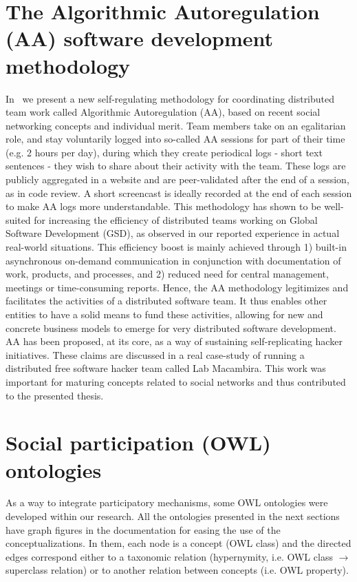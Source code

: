 \begin{apendicesenv}
\section{The Algorithmic Autoregulation (AA) software development methodology}\label{sec:aa}
In~\cite{aaPaper} we present a new self-regulating methodology for coordinating distributed team work called Algorithmic Autoregulation (AA),
based on recent social networking concepts and individual merit.
Team members take on an egalitarian role, and stay voluntarily logged into so-called AA sessions for part of their time 
(e.g. 2 hours per day), during which they create periodical logs - short text sentences - 
they wish to share about their activity with the team.
These logs are publicly aggregated in a website and are peer-validated after the end of a session,
as in code review. 
A short screencast is ideally recorded at the end of each session to make AA logs more understandable.
This methodology has shown to be well-suited for increasing the efficiency of distributed teams working on 
Global Software Development (GSD), as observed in our reported experience in actual real-world situations.
This efficiency boost is mainly achieved through 1) built-in asynchronous on-demand communication in 
conjunction with documentation of work, products, and processes, and 2) reduced need for central management,
meetings or time-consuming reports.
Hence, the AA methodology legitimizes and facilitates the activities of a distributed software team.
It thus enables other entities to have a solid means to fund these activities, 
allowing for new and concrete business models to emerge for very distributed software development. 
AA has been proposed, at its core, as a way of sustaining self-replicating hacker initiatives.
These claims are discussed in a real case-study of running a distributed free software hacker team called Lab Macambira.
This work was important for maturing concepts related to social networks and thus contributed to the presented thesis.

\section{Social participation (OWL) ontologies}\label{sec:spont}
As a way to integrate participatory mechanisms, some OWL ontologies were developed within our research.
All the ontologies presented in the next sections have graph figures in the documentation for easing the use of
the conceptualizations.
In them, each node is a concept (OWL class) and the directed edges correspond either to a taxonomic relation
(hypernymity, i.e. OWL class $\rightarrow$ superclass relation) or to another relation between concepts (i.e. OWL property).


\end{apendicesenv}
